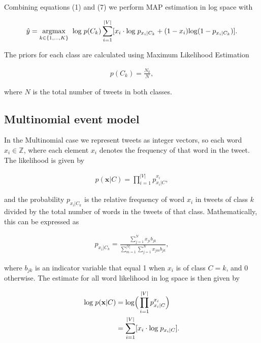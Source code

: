 \documentclass{article}
\renewcommand{\vec}[1]{\mathbf{#1}}
\begin{document}
\noindent
Combining equations (1) and (7) we perform MAP estimation in log space with

\begin{align}
\hat{y} = \underset{k \in \{1,\dots,K\}}{\rm{argmax}} \hspace{2mm} \mathrm{log}\hspace{1mm} p(C_k)\sum_{i=1}^{|V|} \lbrack x_i \cdot \mathrm{log} \hspace{1mm} p_{x_i|C_k} + (1-x_i)\mathrm{log}(1-p_{x_i|C_k}) \rbrack.
\end{align}

\noindent
The priors for each class are calculated using Maximum Likelihood Estimation

\begin{align}
p(C_k) = \frac{N_k}{N},
\end{align}

\noindent
where $N$ is the total number of tweets in both classes.

\subsection{Multinomial event model}

In the Multinomial case we represent tweets as integer vectors, so each word $x_i \in \mathbb{Z}$, where each element $x_i$ denotes the frequency of that word in the tweet. The likelihood is given by

\begin{align}
p(\vec{x}|C) = \prod^{|V|}_{i=1} p_{x_i|C}^{x_i},
\end{align}

\noindent
and the probability $p_{x_i|C_k}$ is the relative frequency of word $x_i$ in tweets of class $k$ divided by the total number of words in the tweets of that class. Mathematically, this can be expressed as

\begin{align}
p_{x_i|C_k} = \frac{\sum^N_{j=1} x_{ji}b_{jk}}{\sum^{|V|}_{m=1}\sum^{N}_{j=1} x_{jm} b_{jk}},
\end{align}

\noindent
where $b_{jk}$ is an indicator variable that equal 1 when $x_i$ is of class $C=k$, and 0 otherwise. The estimate for all word likelihood in log space is then given by


\begin{align}
\mathrm{log} \hspace{1mm} p(\vec{x}|C) &= \mathrm{log}\Big(\prod^{|V|}_{i=1} p_{x_i|C}^{x_i}\Big) \\
                     &= \sum_{i=1}^{|V|} \lbrack x_i \cdot \mathrm{log} \hspace{1mm} p_{x_i|C} \rbrack.
\end{align}
\end{document}
